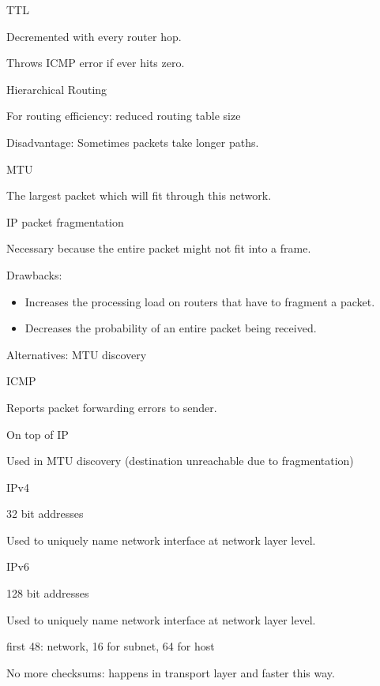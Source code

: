\documentclass[main.tex]{subfiles}
\begin{document}
\begin{card}{TTL}
\item Decremented with every router hop.
\item Throws ICMP error if ever hits zero.
\end{card}

\begin{card}{Hierarchical Routing}
\item For routing efficiency: reduced routing table size
\item Disadvantage: Sometimes packets take longer paths.
\end{card}

\begin{card}{MTU}
\item The largest packet which will fit through this network.
\end{card}

\begin{card}{IP packet fragmentation}
\item Necessary because the entire packet might not fit into a frame.
\item Drawbacks:
    \begin{itemize}
        \item Increases the processing load on routers that have to fragment a packet.
        \item Decreases the probability of an entire packet being received.
    \end{itemize}
\item Alternatives: MTU discovery
\end{card}

\begin{card}{ICMP}
\item Reports packet forwarding errors to sender.
\item On top of IP
\item Used in MTU discovery (destination unreachable due to fragmentation)
\end{card}

\begin{card}{IPv4}
\item 32 bit addresses
\item Used to uniquely name network interface at network layer level.
\end{card}

\begin{card}{IPv6}
\item 128 bit addresses
\item Used to uniquely name network interface at network layer level.
\item first 48: network, 16 for subnet, 64 for host
\item No more checksums: happens in transport layer and faster this way.
\end{card}
\end{document}
